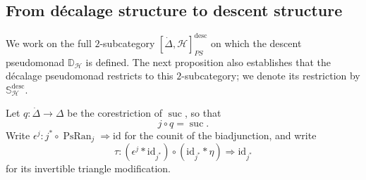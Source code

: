 \documentclass[11pt,a4paper]{article}
\numberwithin{equation}{section}
\theoremstyle{definition}
\theoremstyle{remark}
\newcommand{\id}{\mathrm{id}}
\newcommand{\Hcat}{\mathcal H}
\newcommand{\PsRan}{\operatorname{PsRan}}
\newcommand{\suc}{\operatorname{suc}}
\newcommand{\Dmon}{\mathbb D}
\newcommand{\Smon}{\mathbb S}
\begin{document}
\subsection{From d\'ecalage structure to descent structure}

We work on the full $2$-subcategory
$[\dot\Delta,\Hcat]_{PS}^{\mathrm{desc}}$ on which the descent
pseudomonad $\Dmon_{\Hcat}$ is defined. The next proposition also
establishes that the d\'ecalage pseudomonad restricts to this
$2$-subcategory; we denote its restriction by
$\Smon_{\Hcat}^{\mathrm{desc}}$.

Let $q\colon\dot\Delta\to\Delta$ be the corestriction of $\suc$,
so that
\begin{equation}
  j\circ q=\suc.
  \label{eq:q-corestriction}
\end{equation}
Write $\epsilon^j\colon j^*\circ\PsRan_j\Rightarrow\id$ for the counit
of the biadjunction, and write
\[
  \tau\colon(\epsilon^j\ast\id_{j^*})\circ(\id_{j^*}\ast\eta)
       \Longrightarrow\id_{j^*}
\]
for its invertible triangle modification.
\end{document}
